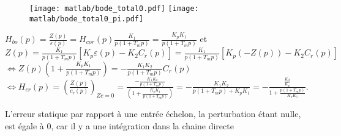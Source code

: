 \begin{figure}[!h]
\texttt{[image: matlab/bode\_total0.pdf]}
\texttt{[image: matlab/bode\_total0\_pi.pdf]}
\end{figure}
%




\ifprof
\newpage

\question{}%


${H_{bo}}(p) = \frac{{Z(p)}}{{\varepsilon (p)}} = {H_{cor}}(p)\frac{{{K_1}}}{{p(1 + {T_m}p)}} = \frac{{{K_p}{K_1}}}{{p(1 + {T_m}p)}}$
et $Z(p) = \frac{{{K_1}}}{{p(1 + {T_m}p)}}\left[ {{K_p}\varepsilon (p) - {K_2}{C_r}(p)} \right] = \frac{{{K_1}}}{{p(1 + {T_m}p)}}\left[ {{K_p}( - Z(p)) - {K_2}{C_r}(p)} \right]$
$\Leftrightarrow 
Z(p)(1 + \frac{{{K_p}{K_1}}}{{p(1 + {T_m}p)}}) =  - \frac{{{K_1}{K_2}}}{{p(1 + {T_m}p)}}{C_r}(p)$
$\Leftrightarrow 
{H_{cr}}(p) = {\left( {\frac{{Z(p)}}{{{c_r}(p)}}} \right)_{Zc = 0}} = \frac{{ - \frac{{{K_1}{K_2}}}{{p(1 + {T_m}p)}}}}{{(1 + \frac{{{K_p}{K_1}}}{{p(1 + {T_m}p)}})}} =  - \frac{{{K_1}{K_2}}}{{p(1 + {T_m}p) + {K_p}{K_1}}} =  - \frac{{\frac{{{K_2}}}{{{K_p}}}}}{{1 + \frac{{p(1 + {T_m}p)}}{{{K_p}{K_1}}}}}$.

\question{}%

L'erreur statique par rapport  à une entrée échelon, la perturbation étant nulle, est égale à 0, car il y a une intégration dans la chaine directe

